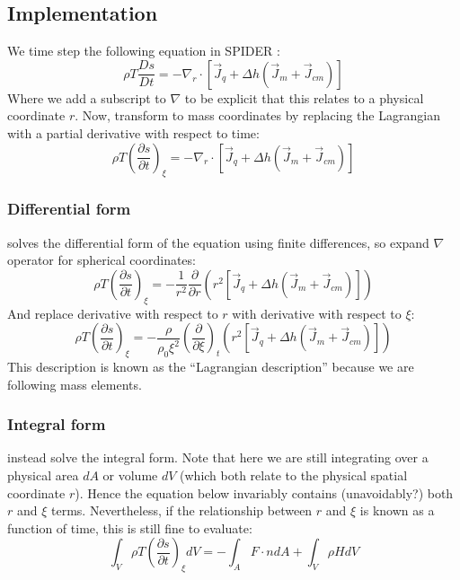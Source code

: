 \subsection{Implementation}
We time step the following equation in SPIDER :
\begin{equation}
\rho T \frac{Ds}{Dt} = -\nabla_r \cdot \left[ \vec{J}_q + \Delta h (\vec{J}_m + \vec{J}_{cm}) \right]
\end{equation}
Where we add a subscript to $\nabla$ to be explicit that this relates to a physical coordinate $r$.  Now, transform to mass coordinates by replacing the Lagrangian with a partial derivative with respect to time:
\begin{equation}
\rho T \left( \frac{\partial s}{\partial t} \right)_\xi = -\nabla_r \cdot \left[ \vec{J}_q + \Delta h (\vec{J}_m + \vec{J}_{cm}) \right]
\end{equation}

\subsubsection{Differential form}
\cite{ABE93} solves the differential form of the equation using finite differences, so expand $\nabla$ operator for spherical coordinates:
\begin{equation}
\rho T \left( \frac{\partial s}{\partial t} \right)_\xi = -\frac{1}{r^2} \frac{\partial}{\partial r} \left( r^2 \left[ \vec{J}_q + \Delta h (\vec{J}_m + \vec{J}_{cm}) \right] \right)
\end{equation}
And replace derivative with respect to $r$ with derivative with respect to $\xi$:
\begin{equation}
\rho T \left( \frac{\partial s}{\partial t} \right)_\xi = - \frac{\rho}{\rho_0 \xi^2} \left(\frac{\partial}{\partial \xi} \right)_t \left( r^2 \left[ \vec{J}_q + \Delta h (\vec{J}_m + \vec{J}_{cm}) \right] \right)
\label{eq:finals}
\end{equation}
This description is known as the ``Lagrangian description'' \citep[e.g.,][]{KWW12} because we are following mass elements.
\subsubsection{Integral form}
\cite{BSW18} instead solve the integral form.  Note that here we are still integrating over a physical area $dA$ or volume $dV$ (which both relate to the physical spatial coordinate $r$).  Hence the equation below invariably contains (unavoidably?) both $r$ and $\xi$ terms.  Nevertheless, if the relationship between $r$ and $\xi$ is known as a function of time, this is still fine to evaluate:
\begin{equation}
\int_V \rho T \left( \frac{\partial s}{\partial t} \right)_\xi dV = - \int_A F \cdot n dA + \int_V \rho H dV
\end{equation}
